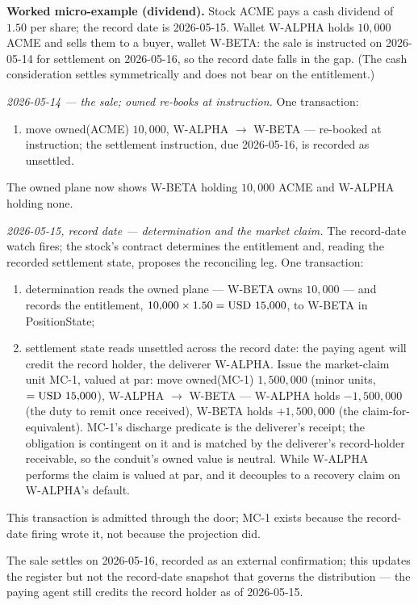 \medskip\noindent\textbf{Worked micro-example (dividend).} Stock ACME pays a cash
dividend of $1.50$ per share; the record date is 2026-05-15. Wallet W-ALPHA holds
$10{,}000$ ACME and sells them to a buyer, wallet W-BETA: the sale is instructed on
2026-05-14 for settlement on 2026-05-16, so the record date falls in the gap. (The
cash consideration settles symmetrically and does not bear on the entitlement.)

\emph{2026-05-14 --- the sale; owned re-books at instruction.} One transaction:
\begin{enumerate}[label=(\arabic*),nosep]
\item move owned(ACME) $10{,}000$, W-ALPHA $\to$ W-BETA --- re-booked at
instruction; the settlement instruction, due 2026-05-16, is recorded as unsettled.
\end{enumerate}
The owned plane now shows W-BETA holding $10{,}000$ ACME and W-ALPHA holding none.

\emph{2026-05-15, record date --- determination and the market claim.} The
record-date watch fires; the stock's contract determines the entitlement and,
reading the recorded settlement state, proposes the reconciling leg. One
transaction:
\begin{enumerate}[label=(\arabic*),nosep]
\item determination reads the owned plane --- W-BETA owns $10{,}000$ --- and records
the entitlement, $10{,}000 \times 1.50 = \mbox{USD~15{,}000}$, to W-BETA in PositionState;
\item settlement state reads unsettled across the record date: the paying agent will
credit the record holder, the deliverer W-ALPHA. Issue the market-claim unit MC-1,
valued at par: move owned(MC-1) $1{,}500{,}000$ (minor units, $=\mbox{USD~15{,}000}$),
W-ALPHA $\to$ W-BETA --- W-ALPHA holds $-1{,}500{,}000$ (the duty to remit once
received), W-BETA holds $+1{,}500{,}000$ (the claim-for-equivalent). MC-1's discharge
predicate is the deliverer's receipt; the obligation is contingent on it and is
matched by the deliverer's record-holder receivable, so the conduit's owned value is
neutral. While W-ALPHA performs the claim is valued at par, and it decouples to a
recovery claim on W-ALPHA's default.
\end{enumerate}
This transaction is admitted through the door; MC-1 exists because the record-date
firing wrote it, not because the projection did.

The sale settles on 2026-05-16, recorded as an external confirmation; this updates
the register but not the record-date snapshot that governs the distribution --- the
paying agent still credits the record holder as of 2026-05-15.

